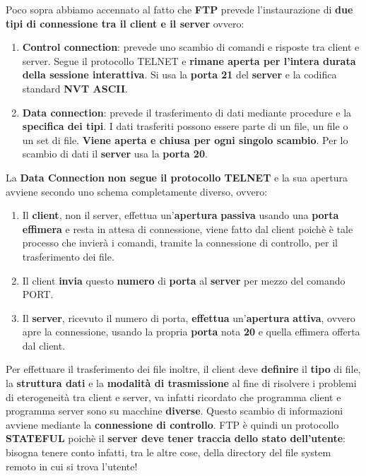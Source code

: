 \documentclass[11pt,a4paper]{article}
\theoremstyle{definition}
\begin{document}
Poco sopra abbiamo accennato al fatto che \textbf{FTP} prevede l'instaurazione di \textbf{due tipi di connessione tra il client e il server} ovvero:
\begin{enumerate}
	\item \textbf{Control connection}: prevede uno scambio di comandi e risposte
	      tra client e server. Segue il protocollo TELNET e \textbf{rimane aperta per l'intera durata della sessione interattiva}. Si usa la \textbf{porta 21} del \textbf{server} e la codifica standard \textbf{NVT ASCII}.
	\item \textbf{Data connection}: prevede il trasferimento di dati mediante procedure e la \textbf{specifica dei tipi}. I dati trasferiti possono essere parte di un file, un file o un set di file. \textbf{Viene aperta e chiusa per ogni singolo scambio}. Per lo scambio di dati il \textbf{server} usa la \textbf{porta 20}.
\end{enumerate}
\newpage
La \textbf{Data Connection} \textbf{non segue il protocollo TELNET} e la sua apertura avviene secondo uno schema completamente diverso, ovvero:
\begin{enumerate}
	\item Il \textbf{client}, non il server, effettua un'\textbf{apertura} \textbf{passiva} usando una \textbf{porta effimera} e resta in attesa di connessione, viene fatto dal client poichè è tale processo che invierà i comandi, tramite la connessione di controllo, per il trasferimento dei file.
	\item Il client \textbf{invia} questo \textbf{numero} di \textbf{porta} al \textbf{server} per mezzo del comando PORT.
	\item Il \textbf{server}, ricevuto il numero di porta, \textbf{effettua} un'\textbf{apertura} \textbf{attiva}, ovvero apre la connessione, usando la propria \textbf{porta} nota \textbf{20} e quella effimera offerta dal client.
\end{enumerate}
Per effettuare il trasferimento dei file inoltre, il client deve \textbf{definire} il \textbf{tipo}
di file, la \textbf{struttura dati} e la \textbf{modalità di trasmissione} al fine di
risolvere i problemi di eterogeneità tra client e server, va infatti ricordato che programma client e programma server sono su macchine \textbf{diverse}. Questo scambio di informazioni avviene mediante la \textbf{connessione di controllo}.\newline\newline
FTP è quindi un protocollo \textbf{STATEFUL} poichè il \textbf{server deve tener traccia dello stato dell’utente}: bisogna tenere conto infatti, tra le altre cose, della directory del file system remoto in cui si trova l'utente!\newline\newline
\end{document}
